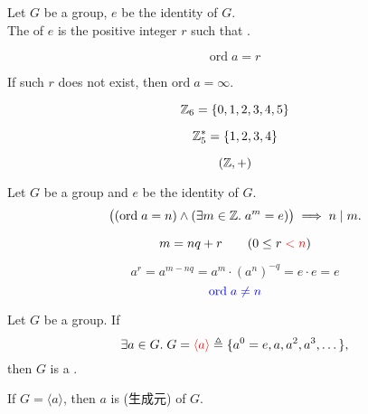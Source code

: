 
\begin{frame}
  \begin{definition}
    Let $G$ be a group, $e$ be the identity of $G$. \\[3pt]
    The  of $e$ is the  positive integer $r$
    such that .

    \[
      \text{ord}\; a = r
    \]
  \end{definition}

  \pause
  \vspace{0.50cm}
  \begin{center}
    If such $r$ does not exist, then $\text{ord}\; a = \infty$.
  \end{center}
\end{frame}

\begin{frame}
  \[
    \mathbb{Z}_{6} = \{0, 1, 2, 3, 4, 5\}
  \]

  \pause
  \[
    \mathbb{Z}^{\ast}_{5} = \{1, 2, 3, 4\}
  \]

  \pause
  \[
    (\mathbb{Z}, +)
  \]
\end{frame}

\begin{frame}{}
  \begin{theorem}
    Let $G$ be a group and $e$ be the identity of $G$.
    \[
      \big((\text{ord}\; a = n) \land (\exists m \in \mathbb{Z}.\; a^{m} = e) \big)
        \implies n \mid m.
    \]
  \end{theorem}

  \pause
  \[
    m = nq + r \qquad (0 \le r \;\textcolor{red}{< n})
  \]

  \pause
  \begin{center}
    \[
      a^{r} = a^{m - nq} = a^m \cdot (a^{n})^{-q} = e \cdot e = e
    \]
    \pause
    \[
      \textcolor{blue}{\text{ord}\; a \neq n}
    \]
  \end{center}
\end{frame}

\begin{frame}
  \begin{definition}
    Let $G$ be a group. If
    \[
      \exists a \in G.\; G = \textcolor{red}{\langle a \rangle}
        \triangleq \{a^{0} = e, a, a^{2}, a^{3}, \dots\},
    \]
    then $G$ is a .
  \end{definition}

  \pause
  \vspace{0.50cm}
  \begin{center}
    If $G = \langle a \rangle$, then $a$ is   (生成元) of $G$.
  \end{center}
\end{frame}

